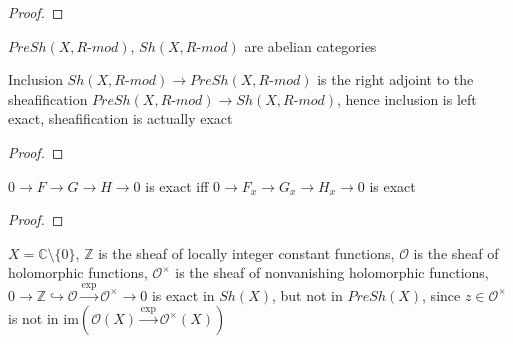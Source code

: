 \documentclass[../main.tex]{subfiles}
\begin{document}
\begin{proof}

\end{proof}

\begin{corollary}
$PreSh(X,R\text{-}mod)$, $Sh(X,R\text{-}mod)$ are abelian categories
\end{corollary}

\begin{theorem}
Inclusion $Sh(X,R\text{-}mod)\to PreSh(X,R\text{-}mod)$ is the right adjoint to the sheafification $PreSh(X,R\text{-}mod)\to Sh(X,R\text{-}mod)$, hence inclusion is left exact, sheafification is actually exact
\end{theorem}

\begin{proof}

\end{proof}

\begin{lemma}
$0\to F\to G\to H\to0$ is exact iff $0\to F_x\to G_x\to H_x\to0$ is exact
\end{lemma}

\begin{proof}

\end{proof}

\begin{example}
$X=\mathbb C\setminus\{0\}$, $\mathbb Z$ is the sheaf of locally integer constant functions, $\mathcal{O}$ is the sheaf of holomorphic functions, $\mathcal{O}^\times$ is the sheaf of nonvanishing holomorphic functions, $0\to\mathbb Z\hookrightarrow\mathcal{O}\xrightarrow{\exp}\mathcal{O}^\times\to0$ is exact in $Sh(X)$, but not in $PreSh(X)$, since $z\in\mathcal{O}^\times$ is not in $\mathrm{im}(\mathcal{O}(X)\xrightarrow{\exp}\mathcal{O}^\times(X))$
\end{example}
\end{document}
